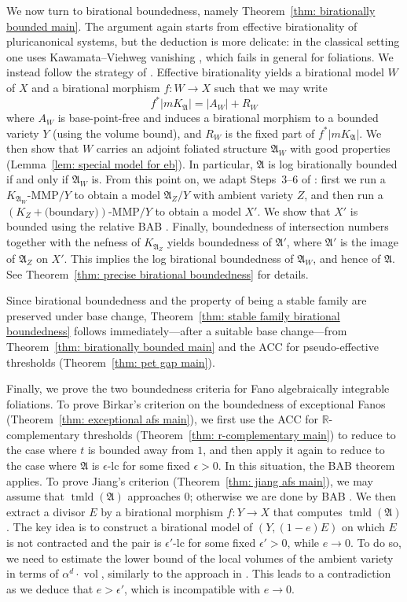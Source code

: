 \documentclass[11pt,reqno]{amsart}
\numberwithin{equation}{section}
\newcommand{\vol}{\operatorname{vol}}
\newcommand{\tmld}{{\operatorname{tmld}}}
\newcommand{\Aa}{{\mathfrak{A}}}
\theoremstyle{definition}
\begin{document}
We now turn to birational boundedness, namely Theorem~\ref{thm: birationally bounded main}. The argument again starts from effective birationality of pluricanonical systems, but the deduction is more delicate: in the classical setting one uses Kawamata--Viehweg vanishing \cite[Lemma~3.2]{HMX13}, which fails in general for foliations. We instead follow the strategy of \cite[Proof of Theorem~6.1]{SS23}. Effective birationality yields a birational model $W$ of $X$ and a birational morphism $f\colon W\to X$ such that we may write
$$f^*|mK_{\Aa}|=|A_W|+R_W$$
where $A_W$ is base-point-free and induces a birational morphism to a bounded variety $Y$ (using the volume bound), and $R_W$ is the fixed part of $f^*|mK_{\Aa}|$. We then show that $W$ carries an adjoint foliated structure $\Aa_W$ with good properties (Lemma~\ref{lem: special model for eb}). In particular, $\Aa$ is log birationally bounded if and only if $\Aa_W$ is. From this point on, we adapt Steps~3--6 of \cite[Proof of Theorem~6.1]{SS23}: first we run a $K_{\Aa_W}$-MMP$/Y$ to obtain a model $\Aa_Z/Y$ with ambient variety $Z$, and then run a $(K_Z+\text{(boundary)})$-MMP$/Y$ to obtain a model $X'$. We show that $X'$ is bounded using the relative BAB \cite{Bir24}. Finally, boundedness of intersection numbers together with the nefness of $K_{\Aa_Z}$ yields boundedness of $\Aa'$, where $\Aa'$ is the image of $\Aa_Z$ on $X'$. This implies the log birational boundedness of $\Aa_W$, and hence of $\Aa$. See Theorem~\ref{thm: precise birational boundedness} for details.

Since birational boundedness and the property of being a stable family are preserved under base change, Theorem~\ref{thm: stable family birational boundedness} follows immediately---after a suitable base change---from Theorem~\ref{thm: birationally bounded main} and the ACC for pseudo-effective thresholds (Theorem~\ref{thm: pet gap main}).

Finally, we prove the two boundedness criteria for Fano algebraically integrable foliations. To prove Birkar's criterion on the boundedness of exceptional Fanos (Theorem~\ref{thm: exceptional afs main}), we first use the ACC for $\mathbb R$-complementary thresholds (Theorem~\ref{thm: r-complementary main}) to reduce to the case where $t$ is bounded away from $1$, and then apply it again to reduce to the case where $\Aa$ is $\epsilon$-lc for some fixed $\epsilon>0$. In this situation, the BAB theorem \cite[Theorem~B]{Cas+25a} applies. To prove Jiang's criterion (Theorem~\ref{thm: jiang afs main}), we may assume that $\tmld(\Aa)$ approaches $0$; otherwise we are done by BAB \cite[Theorem~B]{Cas+25a}. We then extract a divisor $E$ by a birational morphism $f\colon Y\rightarrow X$ that computes $\tmld(\Aa)$. The key idea is to construct a birational model of $(Y,(1-e)E)$ on which $E$ is not contracted and the pair is $\epsilon'$-lc for some fixed $\epsilon'>0$, while $e\to 0$. To do so, we need to estimate the lower bound of the local volumes of the ambient variety in terms of $\alpha^d\cdot\vol$, similarly to the approach in \cite{LLX20}. This leads to a contradiction as we deduce that $e>\epsilon'$, which is incompatible with $e\to 0$.
\end{document}
